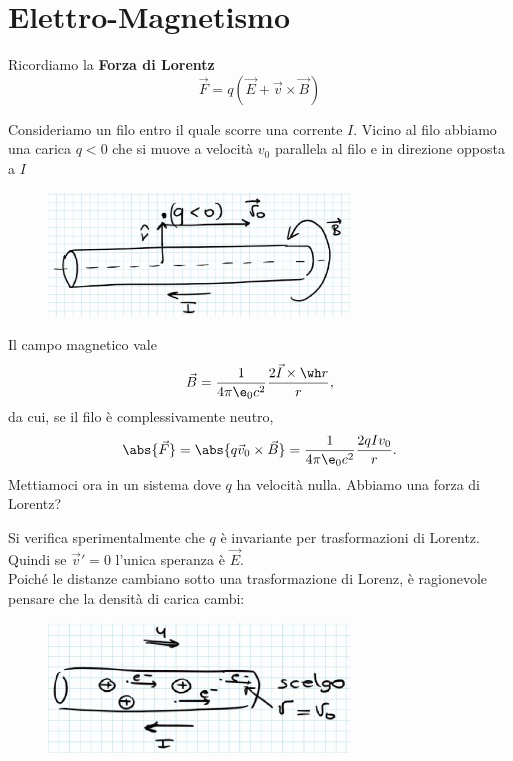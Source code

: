 \section{Elettro-Magnetismo}
Ricordiamo la \textbf{Forza di Lorentz}
\[\vec F=q(\vec E+\vec v\times \vec B)\]

\begin{example}
Consideriamo un filo entro il quale scorre una corrente $I$. Vicino al filo abbiamo una carica $q<0$ che si muove a velocit\`a $v_0$ parallela al filo e in direzione opposta a $I$

\begin{figure}[!htb]
    \centering
    \includegraphics[width=8cm]{images/Filo_e_carica.png}
\end{figure}

\noindent
Il campo magnetico vale
\[\vec B=\frac1{4\pi \e_0c^2}\frac{2 \vec I\times \wh r}r,\]
da cui, se il filo \`e complessivamente neutro,
\[\abs{\vec F}=\abs{q\vec v_0\times \vec B}=\frac1{4\pi \e_0c^2}\frac{2 qIv_0}r.\]
Mettiamoci ora in un sistema dove $q$ ha velocit\`a nulla. Abbiamo una forza di Lorentz?
\medskip

\noindent Si verifica sperimentalmente che $q$ \`e invariante per trasformazioni di Lorentz. Quindi se $\vec v'=0$ l'unica speranza \`e $\vec E$.\\
Poich\'e le distanze cambiano sotto una trasformazione di Lorenz, \`e ragionevole pensare che la densit\`a di carica cambi: 

\begin{figure}[!htb]
    \centering
    \includegraphics[width=8cm]{images/corrente_in_filo.png}
\end{figure}


\end{example}
